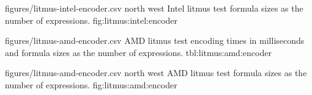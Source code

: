 
\EncoderStatsGraph
  {figures/litmus-intel-encoder.csv}
  {north west}
  {Intel litmus test formula sizes as the number of expressions.}
  {fig:litmus:intel:encoder}

\EncoderStatsTable
  {figures/litmus-amd-encoder.csv}
  {\textnumero}
  {\AMDRowHeader}
  {AMD litmus test encoding times in milliseconds and formula sizes as the number of expressions.}
  {tbl:litmus:amd:encoder}


\EncoderStatsGraph
  {figures/litmus-amd-encoder.csv}
  {north west}
  {AMD litmus test formula sizes as the number of expressions.}
  {fig:litmus:amd:encoder}




\newpage

